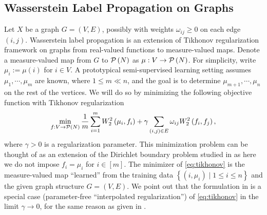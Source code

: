 \documentclass[letterpaper]{article} %
\begin{document}
\subsection{Wasserstein Label Propagation on Graphs}
Let $X$ be a graph $G= \left( V,E \right)$, possibly with weights $\omega_{ij}\geq 0$ on each edge $\left(i,j\right)$. Wasserstein label propagation is an extension of Tikhonov regularization framework on graphs \cite{Belkin2004} from real-valued functions to measure-valued maps. 
Denote a measure-valued map from $G$ to $\P\left( N \right)$ as $\mu:V\rightarrow\P\left( N \right)$. For simplicity, write $\mu_i:=\mu \left( i \right)$ for $i\in V$. A prototypical semi-supervised learning setting assumes $\mu_1,\cdots,\mu_m$ are known, where $1\leq m \ll n$, and the goal is to determine $\mu_{m+1},\cdots,\mu_n$ on the rest of the vertices. We will do so by minimizing the following objective function with Tikhonov regularization
\begin{equation}
  \label{eq:tikhonov}
  \min_{f:V\rightarrow \P\left( N \right)}\frac{1}{m}\sum_{i=1}^m W^2_2 \left( \mu_i,f_i \right)+\gamma\sum_{\left( i,j \right)\in E}\omega_{ij}W^2_2 \left( f_i,f_j \right),
\end{equation}
where $\gamma>0$ is a regularization parameter. This minimization problem can be thought of as an extension of the Dirichlet boundary problem studied in \cite{Solomon:2014} as here we do not impose $f_i=\mu_i$ for $i\in [m]$.
The minimizer of \eqref{eq:tikhonov} is the measure-valued map ``learned'' from the training data $\left\{ \left( i,\mu_i \right)\mid 1\leq i\leq n \right\}$ and the given graph structure $G= \left( V,E \right)$. We point out that the formulation in \cite{Solomon:2014} is a special case (parameter-free ``interpolated regularization'') of \eqref{eq:tikhonov} in the limit $\gamma\rightarrow0$, for the same reason as given in \cite[]{Belkin2004}.
 
\end{document}
